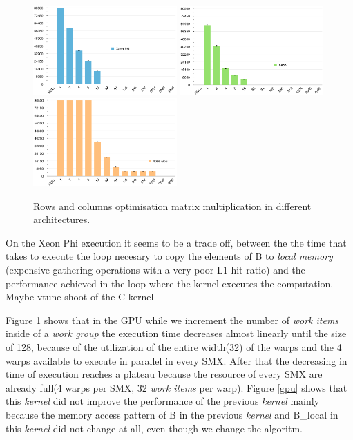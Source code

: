 \begin{figure}[!h]
    \centering
    \includegraphics[width=0.49\textwidth]{figures/opt3_phi.png}
    \includegraphics[width=0.49\textwidth]{figures/opt3_cpu.png}
    \includegraphics[width=0.49\textwidth]{figures/opt3_gpu.png}
    \caption{Rows and columns optimisation matrix multiplication in different 
            architectures.}
    \label{RowsCols}
\end{figure}

\par{On the Xeon Phi execution it seems to be a trade off, 
    between the the time that takes to execute the loop necesary to 
    copy the elements of B to \emph{local memory}
    (expensive gathering operations with a very poor L1 hit ratio) and the 
    performance achieved in the loop where the kernel executes
    the computation.{\color{red} Maybe vtune shoot of the C kernel}}

\par{Figure \ref{RowsCols} shows that in the GPU while we increment the number of \emph{
    work items} inside of a \emph{work group} the execution time decreases almost
    linearly until the size of 128, because of the utilization of the entire
    width(32) of the warps and the 4 warps available to execute in parallel in
    every SMX. After that the decreasing in time of execution reaches a plateau
     because the resource of every SMX are already full(4 warps per SMX, 32 \emph{
        work items} per warp). Figure
     \ref{gpu} shows that this \emph{kernel} did not improve the performance of 
     the previous \emph{kernel} mainly because the memory access pattern of B
     in the previous \emph{kernel} and B\_local in this \emph{kernel} did not
     change at all, even though we change the algoritm.}

